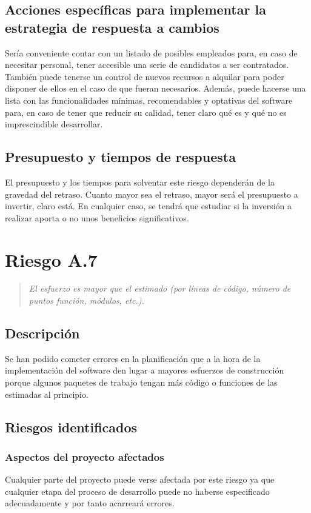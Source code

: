 \documentclass[11pt,a4paper,spanish,twoside]{book}
\begin{document}
\subsection{Acciones específicas para implementar la estrategia de respuesta
  a cambios}
Sería conveniente contar con un listado de posibles empleados para, en caso
de necesitar personal, tener accesible una serie de candidatos a ser
contratados. También puede tenerse un control de nuevos recursos a alquilar
para poder disponer de ellos en el caso de que fueran necesarios. Además,
puede hacerse una lista con las funcionalidades mínimas, recomendables y
optativas del software para, en caso de tener que reducir su calidad, tener
claro qué es y qué no es imprescindible desarrollar.

\subsection{Presupuesto y tiempos de respuesta}
El presupuesto y los tiempos para solventar este riesgo dependerán de la
gravedad del retraso. Cuanto mayor sea el retraso, mayor será el presupuesto
a invertir, claro está. En cualquier caso, se tendrá que estudiar si la
inversión a realizar aporta o no unos beneficios significativos.

\section{Riesgo A.7}
\begin{quote}
\emph{El esfuerzo es mayor que el estimado (por líneas de código, número de
  puntos función, módulos, etc.).}
\end{quote}

\subsection{Descripción}
Se han podido cometer errores en la planificación que a la hora de la
implementación del software den lugar a mayores esfuerzos de construcción
porque algunos paquetes de trabajo tengan más código o funciones de las
estimadas al principio.

\subsection{Riesgos identificados}
\subsubsection{Aspectos del proyecto afectados}
Cualquier parte del proyecto puede verse afectada por este riesgo ya que
cualquier etapa del proceso de desarrollo puede no haberse especificado
adecuadamente y por tanto acarreará errores.
\end{document}
